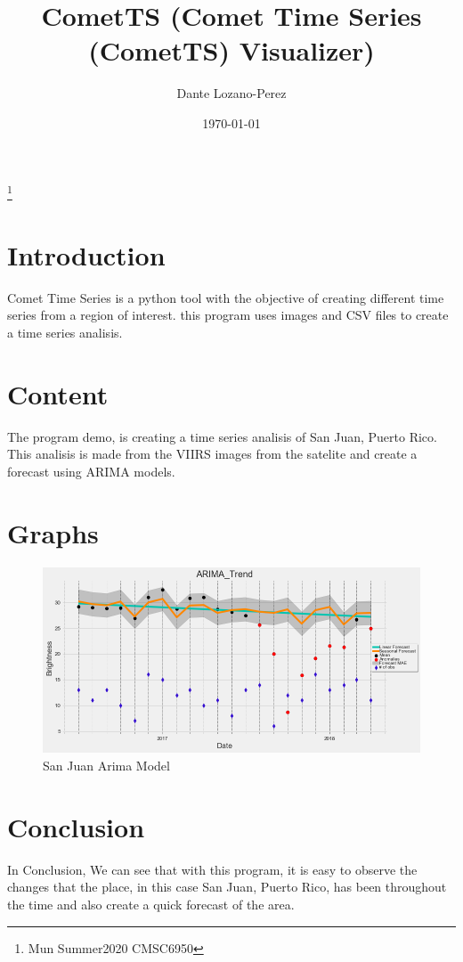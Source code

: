 \documentclass[12pt]{article}
\begin{document}
\title{CometTS (Comet Time Series (CometTS) Visualizer)} 
\author{Dante Lozano-Perez}\thanks{Mun Summer2020 CMSC6950}
\date{\today}

\maketitle

\section{Introduction}
Comet Time Series is a python tool with the objective of creating different time series from a region of interest. this program uses images and CSV files to create a time series analisis.


\section{Content}

The program demo, is creating a time series analisis of San Juan, Puerto Rico. This analisis is made from the VIIRS images from the satelite and create a forecast using ARIMA models.


\section{Graphs}

    \begin{figure}[h]
        \centering
        \includegraphics[width=1.0\textwidth]{ARIMA.png}
        \caption{San Juan Arima Model}
        \label{fig:ARIMA1}
        \end{figure}



\section{Conclusion}
In Conclusion, We can see that with this program, it is easy to observe the changes that the place, in this case San Juan, Puerto Rico, has been throughout the time and also create a quick forecast of the area.
\end{document}
